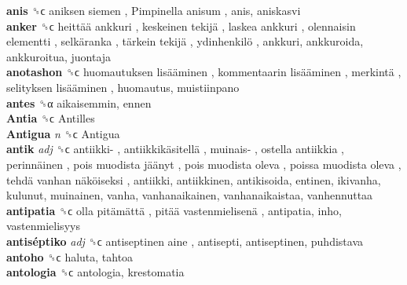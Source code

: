 \textbf{anis} ␝ϲ   aniksen siemen ,  Pimpinella anisum , anis, aniskasvi  \\
\textbf{anker} ␝ϲ   heittää ankkuri ,  keskeinen tekijä ,  laskea ankkuri ,  olennaisin elementti ,  selkäranka ,  tärkein tekijä ,  ydinhenkilö , ankkuri, ankkuroida, ankkuroitua, juontaja  \\
\textbf{anotashon} ␝ϲ   huomautuksen lisääminen ,  kommentaarin lisääminen ,  merkintä ,  selityksen lisääminen , huomautus, muistiinpano  \\
\textbf{antes} ␝α  aikaisemmin, ennen  \\
\textbf{Antia} ␝ϲ   Antilles   \\
\textbf{Antigua} \emph{n}  ␝ϲ   Antigua   \\
\textbf{antik} \emph{adj}  ␝ϲ   antiikki- ,  antiikkikäsitellä ,  muinais- ,  ostella antiikkia ,  perinnäinen ,  pois muodista jäänyt ,  pois muodista oleva ,  poissa muodista oleva ,  tehdä vanhan näköiseksi , antiikki, antiikkinen, antikisoida, entinen, ikivanha, kulunut, muinainen, vanha, vanhanaikainen, vanhanaikaistaa, vanhennuttaa  \\
\textbf{antipatia} ␝ϲ   olla pitämättä ,  pitää vastenmielisenä , antipatia, inho, vastenmielisyys  \\
\textbf{antiséptiko} \emph{adj}  ␝ϲ   antiseptinen aine , antisepti, antiseptinen, puhdistava  \\
\textbf{antoho} ␝ϲ  haluta, tahtoa  \\
\textbf{antologia} ␝ϲ  antologia, krestomatia  \\
